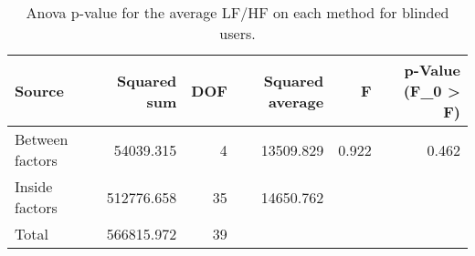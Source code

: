 
\begin{table}[!htb]
\centering
\caption{Anova p-value for the average LF/HF on each method for blinded users.}
\label{tab:anova_average_lfhf}
\begin{tabular}{lrrrrr}
\toprule
         Source &  Squared sum &  DOF & Squared average &     F & p-Value (F\_0 > F) \\
\midrule
Between factors &    54039.315 &    4 &       13509.829 & 0.922 &             0.462 \\
 Inside factors &   512776.658 &   35 &       14650.762 &       &                   \\
          Total &   566815.972 &   39 &                 &       &                   \\
\bottomrule
\end{tabular}
\end{table}

